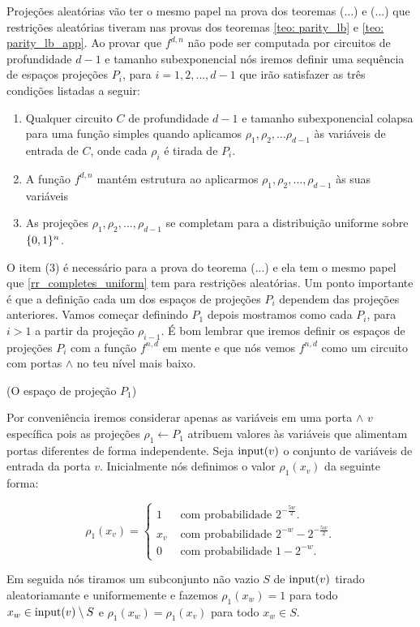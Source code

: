 Projeções aleatórias vão ter o mesmo papel na prova dos teoremas (...) e (...) que restrições aleatórias tiveram nas provas dos teoremas \ref{teo: parity_lb} e \ref{teo: parity_lb_app}. Ao provar que $f^{d, n}$ não pode ser computada por circuitos de profundidade $d - 1$ e tamanho subexponencial nós iremos definir uma sequência de espaços projeções $P_{i}$, para $i = 1, 2, \dots, d - 1$ que irão satisfazer as três condições listadas a seguir:

\begin{enumerate}

	\item Qualquer circuito $C$ de profundidade $d - 1$ e tamanho subexponencial colapsa para uma função simples quando aplicamos $\rho_{1}, \rho_{2}, \dots \rho_{d - 1}$ às variáveis de entrada de $C$, onde cada $\rho_{i}$ é tirada de $P_{i}$.
	
	\item A função $f^{d, n}$ mantém estrutura ao aplicarmos $\rho_{1}, \rho_{2}, \dots, \rho_{d - 1}$ às suas variáveis
	\item As projeções $\rho_{1}, \rho_{2}, \dots, \rho_{d - 1}$ se completam para a distribuição uniforme sobre $\{0, 1\}^{n}$.

\end{enumerate}
O item (3) é necessário para a prova do teorema (...) e ela tem o mesmo papel que \ref{rr_completes_uniform} tem para restrições aleatórias. Um ponto importante é que a definição cada um dos espaços de projeções $P_{i}$ dependem das projeções anteriores. Vamos começar definindo $P_{1}$ depois mostramos como cada $P_{i}$, para $i > 1$ a partir da projeção $\rho_{i - 1}$. É bom lembrar que iremos definir os espaços de projeções $P_{i}$ com a função $f^{n, d}$ em mente e que nós vemos $f^{n, d}$ como um circuito com portas $\land$ no teu nível mais baixo.

\begin{defi} (O espaço de projeção $P_{1}$) \label{defi_P1}

Por conveniência iremos considerar apenas as variáveis em uma porta $\land$ $v$ específica pois as projeções $\rho_{1} \leftarrow P_{1}$ atribuem valores às variáveis que alimentam portas diferentes de forma independente. Seja $\text{input}(v)$ o conjunto de variáveis de entrada da porta $v$. Inicialmente nós definimos o valor $\rho_{1}(x_{v})$ da seguinte forma:

\begin{equation*}
	\rho_{1}(x_{v}) = \begin{cases}
				1 & \text{ com probabilidade } 2^{-\frac{5w}{2}}. \\
				x_{v} & \text{ com probabilidade } 2^{-w} - 2^{-\frac{5w}{2}}. \\
				0 & \text{ com probabilidade } 1 - 2^{-w}.
			  \end{cases}
\end{equation*}

Em seguida nós tiramos um subconjunto não vazio $S$ de $\text{input}(v)$ tirado aleatoriamante e uniformemente e fazemos $\rho_{1}(x_{w}) = 1$ para todo $x_{w} \in \text{input}(v) \setminus S$ e $\rho_{1}(x_{w}) = \rho_{1}(x_{v})$ para todo $x_{w} \in S$.

\end{defi}

